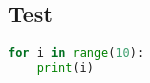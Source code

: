 \newpage
\begin{appendices}
\section{Test}
\begin{lstlisting}[language=python]
for i in range(10):
    print(i)
\end{lstlisting}
\end{appendices}